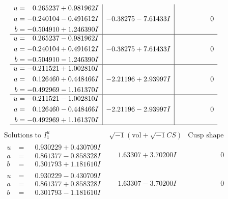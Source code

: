 \documentclass[1p]{elsarticle_modified}
\theoremstyle{definition}
\newcommand{\I}{\sqrt{-1}}
\begin{document}
$$\begin{array}{c|c|c}
\begin{aligned}
u &= \phantom{-}0.265237 + 0.981962 I \\
a &= -0.240104 - 0.491612 I \\
b &= -0.504910 + 1.246390 I\end{aligned}
 & -0.38275 - 7.61433 I & \phantom{-0.000000 } 0 \\ \hline\begin{aligned}
u &= \phantom{-}0.265237 - 0.981962 I \\
a &= -0.240104 + 0.491612 I \\
b &= -0.504910 - 1.246390 I\end{aligned}
 & -0.38275 + 7.61433 I & \phantom{-0.000000 } 0 \\ \hline\begin{aligned}
u &= -0.211521 + 1.002810 I \\
a &= \phantom{-}0.126460 + 0.448466 I \\
b &= -0.492969 - 1.161370 I\end{aligned}
 & -2.21196 + 2.93997 I & \phantom{-0.000000 } 0 \\ \hline\begin{aligned}
u &= -0.211521 - 1.002810 I \\
a &= \phantom{-}0.126460 - 0.448466 I \\
b &= -0.492969 + 1.161370 I\end{aligned}
 & -2.21196 - 2.93997 I & \phantom{-0.000000 } 0\\
 \hline 
 \end{array}$$\newpage$$\begin{array}{c|c|c}  
\text{Solutions to }I^u_{1}& \I (\text{vol} + \sqrt{-1}CS) & \text{Cusp shape}\\
 \hline 
\begin{aligned}
u &= \phantom{-}0.930229 + 0.430709 I \\
a &= \phantom{-}0.861377 - 0.858328 I \\
b &= \phantom{-}0.301793 + 1.181610 I\end{aligned}
 & \phantom{-}1.63307 + 3.70200 I & \phantom{-0.000000 } 0 \\ \hline\begin{aligned}
u &= \phantom{-}0.930229 - 0.430709 I \\
a &= \phantom{-}0.861377 + 0.858328 I \\
b &= \phantom{-}0.301793 - 1.181610 I\end{aligned}
 & \phantom{-}1.63307 - 3.70200 I & \phantom{-0.000000 } 0 \\ \hline\begin{aligned}

\end{aligned}
\end{array}$$
\end{document}
